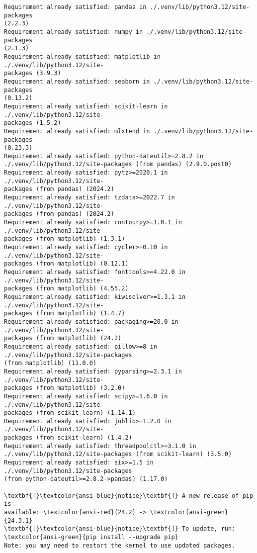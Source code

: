 \documentclass[11pt]{article}
\begin{document}
    \begin{Verbatim}[commandchars=\\\{\}]
Requirement already satisfied: pandas in ./.venv/lib/python3.12/site-packages
(2.2.3)
Requirement already satisfied: numpy in ./.venv/lib/python3.12/site-packages
(2.1.3)
Requirement already satisfied: matplotlib in ./.venv/lib/python3.12/site-
packages (3.9.3)
Requirement already satisfied: seaborn in ./.venv/lib/python3.12/site-packages
(0.13.2)
Requirement already satisfied: scikit-learn in ./.venv/lib/python3.12/site-
packages (1.5.2)
Requirement already satisfied: mlxtend in ./.venv/lib/python3.12/site-packages
(0.23.3)
Requirement already satisfied: python-dateutil>=2.8.2 in
./.venv/lib/python3.12/site-packages (from pandas) (2.9.0.post0)
Requirement already satisfied: pytz>=2020.1 in ./.venv/lib/python3.12/site-
packages (from pandas) (2024.2)
Requirement already satisfied: tzdata>=2022.7 in ./.venv/lib/python3.12/site-
packages (from pandas) (2024.2)
Requirement already satisfied: contourpy>=1.0.1 in ./.venv/lib/python3.12/site-
packages (from matplotlib) (1.3.1)
Requirement already satisfied: cycler>=0.10 in ./.venv/lib/python3.12/site-
packages (from matplotlib) (0.12.1)
Requirement already satisfied: fonttools>=4.22.0 in ./.venv/lib/python3.12/site-
packages (from matplotlib) (4.55.2)
Requirement already satisfied: kiwisolver>=1.3.1 in ./.venv/lib/python3.12/site-
packages (from matplotlib) (1.4.7)
Requirement already satisfied: packaging>=20.0 in ./.venv/lib/python3.12/site-
packages (from matplotlib) (24.2)
Requirement already satisfied: pillow>=8 in ./.venv/lib/python3.12/site-packages
(from matplotlib) (11.0.0)
Requirement already satisfied: pyparsing>=2.3.1 in ./.venv/lib/python3.12/site-
packages (from matplotlib) (3.2.0)
Requirement already satisfied: scipy>=1.6.0 in ./.venv/lib/python3.12/site-
packages (from scikit-learn) (1.14.1)
Requirement already satisfied: joblib>=1.2.0 in ./.venv/lib/python3.12/site-
packages (from scikit-learn) (1.4.2)
Requirement already satisfied: threadpoolctl>=3.1.0 in
./.venv/lib/python3.12/site-packages (from scikit-learn) (3.5.0)
Requirement already satisfied: six>=1.5 in ./.venv/lib/python3.12/site-packages
(from python-dateutil>=2.8.2->pandas) (1.17.0)

\textbf{[}\textcolor{ansi-blue}{notice}\textbf{]} A new release of pip is
available: \textcolor{ansi-red}{24.2} -> \textcolor{ansi-green}{24.3.1}
\textbf{[}\textcolor{ansi-blue}{notice}\textbf{]} To update, run:
\textcolor{ansi-green}{pip install --upgrade pip}
Note: you may need to restart the kernel to use updated packages.
    \end{Verbatim}
\end{document}
